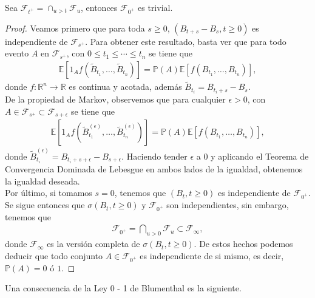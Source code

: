 \begin{theorem}
\label{blumenthal}
Sea $\mathcal{F}_{t^{+}} = \cap_{u > t} \mathcal{F}_u$, entonces $\mathcal{F}_{0^{+}}$ es trivial.
\end{theorem}
\begin{proof}
Veamos primero que para toda $s \geq 0$, $(B_{t+s} - B_s, t \geq 0)$ es independiente de $\mathcal{F}_{s^{+}}$. Para obtener este resultado, basta ver que para todo evento $A$ en $\mathcal{F}_{s^{+}}$, con $0 \leq t_1 \leq \cdots \leq t_n$ se tiene que
	 \begin{align*}
	 \mathbb{E} \left[ 1_A f \left( \tilde{B}_{t_1}, \ldots, \tilde{B}_{t_n} \right) \right] = \mathbb{P} (A) \mathbb{E} \left[ f \left( B_{t_1}, \ldots, B_{t_n} \right) \right],
	 \end{align*}
donde $f : \mathbb{R}^n \rightarrow \mathbb{R}$ es continua y acotada, además $\tilde{B}_{t_i} = B_{t_i + s} - B_s$. \\

De la propiedad de Markov, observemos que para cualquier $\epsilon > 0$, con $A \in \mathcal{F}_{s^{+}} \subset \mathcal{F}_{s + \epsilon}$ se tiene que
	 \begin{align*}
	 \mathbb{E} \left[ 1_A f \left( \tilde{B}_{t_1}^{(\epsilon)}, \ldots, \tilde{B}_{t_n}^{(\epsilon)} \right) \right] = \mathbb{P} (A) \mathbb{E} \left[ f \left( B_{t_1}, \ldots, B_{t_n} \right) \right],
	 \end{align*}
donde $\tilde{B}_{t_i}^{(\epsilon)} = B_{t_i + s + \epsilon} - B_{s + \epsilon}$. Haciendo tender $\epsilon$ a $0$ y aplicando el Teorema de Convergencia Dominada de Lebesgue en ambos lados de la igualdad, obtenemos la igualdad deseada. \\

Por último, si tomamos $s = 0$, tenemos que $(B_t, t \geq 0)$ es independiente de $\mathcal{F}_{0^{+}}$. Se sigue entonces que $\sigma(B_t, t \geq 0)$ y $\mathcal{F}_{0^{+}}$ son independientes, sin embargo, tenemos que 
	\begin{align*}
	\mathcal{F}_{0^{+}} = \bigcap_{u > 0} \mathcal{F}_u \subset \mathcal{F}_{\infty},
	\end{align*}
donde $\mathcal{F}_{\infty}$ es la versión completa de $\sigma(B_t, t \geq 0)$. De estos hechos podemos deducir que todo conjunto $A \in \mathcal{F}_{0^{+}}$ es independiente de si mismo, es decir, $\mathbb{P} (A) = 0$ ó $1$.
\end{proof}

Una consecuencia de la Ley 0 - 1 de Blumenthal es la siguiente. 

